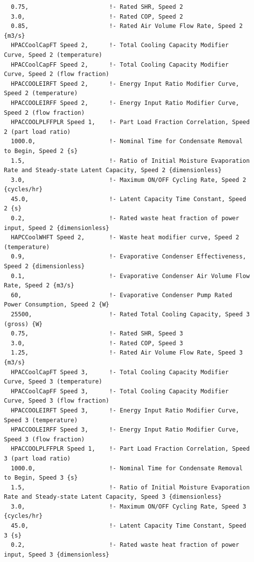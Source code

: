 \begin{lstlisting}
  0.75,                       !- Rated SHR, Speed 2
  3.0,                        !- Rated COP, Speed 2
  0.85,                       !- Rated Air Volume Flow Rate, Speed 2 {m3/s}
  HPACCoolCapFT Speed 2,      !- Total Cooling Capacity Modifier Curve, Speed 2 (temperature)
  HPACCoolCapFF Speed 2,      !- Total Cooling Capacity Modifier Curve, Speed 2 (flow fraction)
  HPACCOOLEIRFT Speed 2,      !- Energy Input Ratio Modifier Curve, Speed 2 (temperature)
  HPACCOOLEIRFF Speed 2,      !- Energy Input Ratio Modifier Curve, Speed 2 (flow fraction)
  HPACCOOLPLFFPLR Speed 1,    !- Part Load Fraction Correlation, Speed 2 (part load ratio)
  1000.0,                     !- Nominal Time for Condensate Removal to Begin, Speed 2 {s}
  1.5,                        !- Ratio of Initial Moisture Evaporation Rate and Steady-state Latent Capacity, Speed 2 {dimensionless}
  3.0,                        !- Maximum ON/OFF Cycling Rate, Speed 2 {cycles/hr}
  45.0,                       !- Latent Capacity Time Constant, Speed 2 {s}
  0.2,                        !- Rated waste heat fraction of power input, Speed 2 {dimensionless}
  HAPCCoolWHFT Speed 2,       !- Waste heat modifier curve, Speed 2 (temperature)
  0.9,                        !- Evaporative Condenser Effectiveness, Speed 2 {dimensionless}
  0.1,                        !- Evaporative Condenser Air Volume Flow Rate, Speed 2 {m3/s}
  60,                         !- Evaporative Condenser Pump Rated Power Consumption, Speed 2 {W}
  25500,                      !- Rated Total Cooling Capacity, Speed 3 (gross) {W}
  0.75,                       !- Rated SHR, Speed 3
  3.0,                        !- Rated COP, Speed 3
  1.25,                       !- Rated Air Volume Flow Rate, Speed 3 {m3/s}
  HPACCoolCapFT Speed 3,      !- Total Cooling Capacity Modifier Curve, Speed 3 (temperature)
  HPACCoolCapFF Speed 3,      !- Total Cooling Capacity Modifier Curve, Speed 3 (flow fraction)
  HPACCOOLEIRFT Speed 3,      !- Energy Input Ratio Modifier Curve, Speed 3 (temperature)
  HPACCOOLEIRFF Speed 3,      !- Energy Input Ratio Modifier Curve, Speed 3 (flow fraction)
  HPACCOOLPLFFPLR Speed 1,    !- Part Load Fraction Correlation, Speed 3 (part load ratio)
  1000.0,                     !- Nominal Time for Condensate Removal to Begin, Speed 3 {s}
  1.5,                        !- Ratio of Initial Moisture Evaporation Rate and Steady-state Latent Capacity, Speed 3 {dimensionless}
  3.0,                        !- Maximum ON/OFF Cycling Rate, Speed 3 {cycles/hr}
  45.0,                       !- Latent Capacity Time Constant, Speed 3 {s}
  0.2,                        !- Rated waste heat fraction of power input, Speed 3 {dimensionless}

\end{lstlisting}
